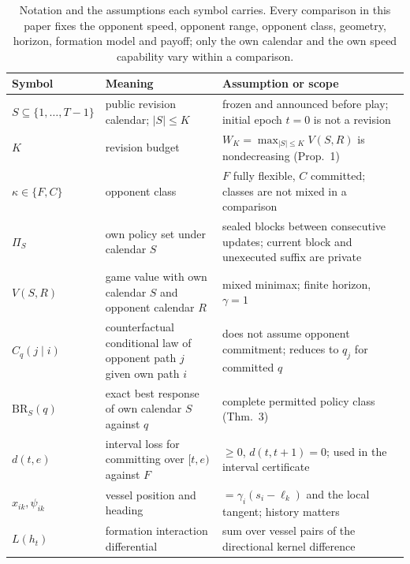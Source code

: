 \begin{table}[!htb]
\centering\small
\caption{Notation and the assumptions each symbol carries.  Every
comparison in this paper fixes the opponent speed, opponent range, opponent
class, geometry, horizon, formation model and payoff; only the own calendar
and the own speed capability vary within a comparison.}
\label{tab:notation}
\begin{tabular}{p{2.5cm}p{4.4cm}p{6.6cm}}
\toprule
Symbol & Meaning & Assumption or scope \\
\midrule
$S\subseteq\{1,\dots,T-1\}$ & public revision calendar; $|S|\le K$ & frozen and announced before play; initial epoch $t=0$ is not a revision \\
$K$ & revision budget & $W_K=\max_{|S|\le K}V(S,R)$ is nondecreasing (Prop.~1) \\
$\kappa\in\{F,C\}$ & opponent class & $F$ fully flexible, $C$ committed; classes are not mixed in a comparison \\
$\Pi_S$ & own policy set under calendar $S$ & sealed blocks between consecutive updates; current block and unexecuted suffix are private \\
$V(S,R)$ & game value with own calendar $S$ and opponent calendar $R$ & mixed minimax; finite horizon, $\gamma=1$ \\
$C_q(j\mid i)$ & counterfactual conditional law of opponent path $j$ given own path $i$ & does not assume opponent commitment; reduces to $q_j$ for committed $q$ \\
$\mathrm{BR}_S(q)$ & exact best response of own calendar $S$ against $q$ & complete permitted policy class (Thm.~3) \\
$d(t,e)$ & interval loss for committing over $[t,e)$ against $F$ & $\ge0$, $d(t,t+1)=0$; used in the interval certificate \\
$x_{ik},\psi_{ik}$ & vessel position and heading & $=\gamma_i(s_i-\ell_k)$ and the local tangent; history matters \\
$L(h_t)$ & formation interaction differential & sum over vessel pairs of the directional kernel difference \\
\bottomrule
\end{tabular}
\end{table}
